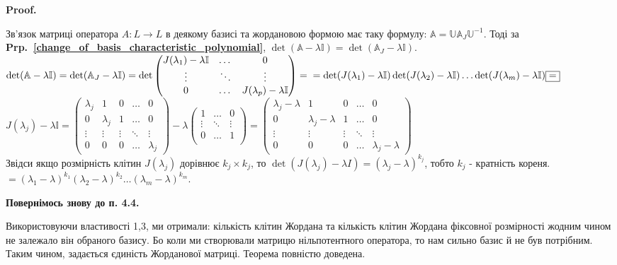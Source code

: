 \documentclass[a4paper, 10pt]{article}
\makeatletter
\theoremstyle{theoremdd}
\newcommand\prpref[1]{\textbf{Prp.~\ref{#1}}}
\renewenvironment{proof}[1][Proof.\\]{\par
\pushQED{\hfill \qed}%
\normalfont \topsep6\p@\@plus6\p@\relax
\trivlist
\item\relax
{\bfseries
#1\@addpunct{.}}\hspace\labelsep\ignorespaces
}{%
\popQED\endtrivlist\@endpefalse
}
\makeatother
\begin{document}
\begin{proof}
Зв'язок матриці оператора $A: L \to L$ в деякому базисі та жордановою формою має таку формулу: $\mathbb{A} = \mathbb{U} \mathbb{A}_J \mathbb{U}^{-1}$. Тоді за \prpref{change_of_basis_characteristic_polynomial}, $\det (\mathbb{A}-\lambda \mathbb{I}) = \det (\mathbb{A}_J -\lambda \mathbb{I})$.\\
$\det (\mathbb{A} - \lambda \mathbb{I}) = \det (\mathbb{A}_{J} - \lambda \mathbb{I}) = \det \begin{pmatrix}
J(\lambda_1) - \lambda \mathbb{I} & \dots & 0 \\
\vdots & \ddots & \vdots \\
0 & \dots & J(\lambda_p) - \lambda \mathbb{I}
\end{pmatrix} = \\ = \det(J(\lambda_1)-\lambda \mathbb{I}) \det(J(\lambda_2)-\lambda \mathbb{I}) \dots \det(J(\lambda_m)-\lambda \mathbb{I}) \boxed{=} \\
$
$J(\lambda_j)-\lambda \mathbb{I} = \begin{pmatrix}
\lambda_j & 1 & 0 & \dots & 0 \\
0 & \lambda_j & 1 & \dots & 0 \\
\vdots & \vdots & \vdots & \ddots & \vdots \\
0 & 0 & 0 & \dots & \lambda_j
\end{pmatrix} - \lambda \begin{pmatrix}
1 & \dots & 0 \\
\vdots & \ddots & \vdots \\
0 & \dots & 1 \\
\end{pmatrix} = \begin{pmatrix}
\lambda_j - \lambda & 1 & 0 & \dots & 0 \\
0 & \lambda_j - \lambda & 1 & \dots & 0 \\
\vdots & \vdots & \vdots & \ddots & \vdots \\
0 & 0 & 0 & \dots & \lambda_j - \lambda
\end{pmatrix}$\\
Звідси якщо розмірність клітин $J(\lambda_j)$ дорівнює $k_j \times k_j$, то $\det (J(\lambda_j) - \lambda I) = (\lambda_j - \lambda)^{k_j}$, тобто $k_j$ - кратність кореня.\\
$\boxed{=} (\lambda_1-\lambda)^{k_1}(\lambda_2-\lambda)^{k_2} \dots (\lambda_m-\lambda)^{k_m}$.
\end{proof}
\fi

\begin{center}
\textbf{Повернімось знову до п. 4.4.}
\end{center}
\noindent
Використовуючи властивості 1,3, ми отримали: кількість клітин Жордана та кількість клітин Жордана фіксовної розмірності жодним чином не залежало він обраного базису. Бо коли ми створювали матрицю нільпотентного оператора, то нам сильно базис й не був потрібним.\\
Таким чином, задається єдиність Жорданової матриці. Теорема повністю доведена.
\end{document}
